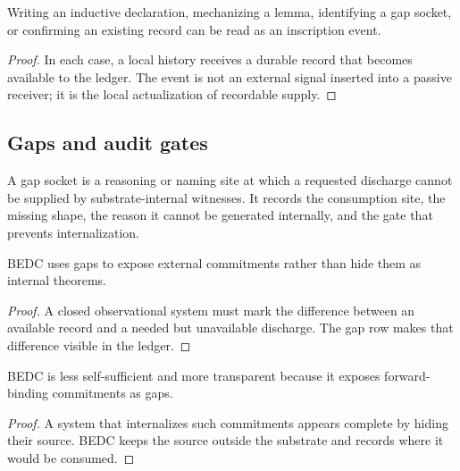 \begin{corollary}
\label{cor:philosophy-contribution-inscription-event}
Writing an inductive declaration, mechanizing a lemma, identifying a
gap socket, or confirming an existing record can be read as an
inscription event.
\end{corollary}
\begin{proof}
In each case, a local history receives a durable record that becomes
available to the ledger. The event is not an external signal inserted
into a passive receiver; it is the local actualization of recordable
supply.
\end{proof}

\subsection{Gaps and audit gates}
\label{subsec:philosophy-gaps-audit-gates}

\begin{definition}
\label{def:philosophy-gap-socket}
A gap socket is a reasoning or naming site at which a requested
discharge cannot be supplied by substrate-internal witnesses. It
records the consumption site, the missing shape, the reason it cannot
be generated internally, and the gate that prevents internalization.
\end{definition}

\begin{theorem}
\label{thm:philosophy-gap-honesty-mechanism}
BEDC uses gaps to expose external commitments rather than hide them as
internal theorems.
\end{theorem}
\begin{proof}
A closed observational system must mark the difference between an
available record and a needed but unavailable discharge. The gap row
makes that difference visible in the ledger.
\end{proof}

\begin{corollary}
\label{cor:philosophy-gaps-transparency}
BEDC is less self-sufficient and more transparent because it exposes
forward-binding commitments as gaps.
\end{corollary}
\begin{proof}
A system that internalizes such commitments appears complete by hiding
their source. BEDC keeps the source outside the substrate and records
where it would be consumed.
\end{proof}

